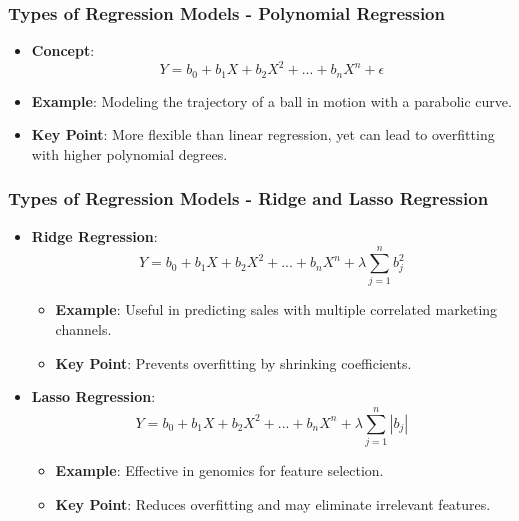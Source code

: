 \documentclass[aspectratio=169]{beamer}
\begin{document}
\begin{frame}[fragile]
    \frametitle{Types of Regression Models - Polynomial Regression}
    \begin{itemize}
        \item \textbf{Concept}:
        \begin{equation}
            Y = b_0 + b_1X + b_2X^2 + ... + b_nX^n + \epsilon
        \end{equation}

        \item \textbf{Example}: Modeling the trajectory of a ball in motion with a parabolic curve.

        \item \textbf{Key Point}: More flexible than linear regression, yet can lead to overfitting with higher polynomial degrees.
    \end{itemize}
\end{frame}

\begin{frame}[fragile]
    \frametitle{Types of Regression Models - Ridge and Lasso Regression}
    \begin{itemize}
        \item \textbf{Ridge Regression}:
        \begin{equation}
            Y = b_0 + b_1X + b_2X^2 + ... + b_nX^n + \lambda \sum_{j=1}^n b_j^2
        \end{equation}
        \begin{itemize}
            \item \textbf{Example}: Useful in predicting sales with multiple correlated marketing channels.
            \item \textbf{Key Point}: Prevents overfitting by shrinking coefficients.
        \end{itemize}

        \item \textbf{Lasso Regression}:
        \begin{equation}
            Y = b_0 + b_1X + b_2X^2 + ... + b_nX^n + \lambda \sum_{j=1}^n |b_j|
        \end{equation}
        \begin{itemize}
            \item \textbf{Example}: Effective in genomics for feature selection.
            \item \textbf{Key Point}: Reduces overfitting and may eliminate irrelevant features.
        \end{itemize}
    \end{itemize}
\end{frame}
\end{document}
